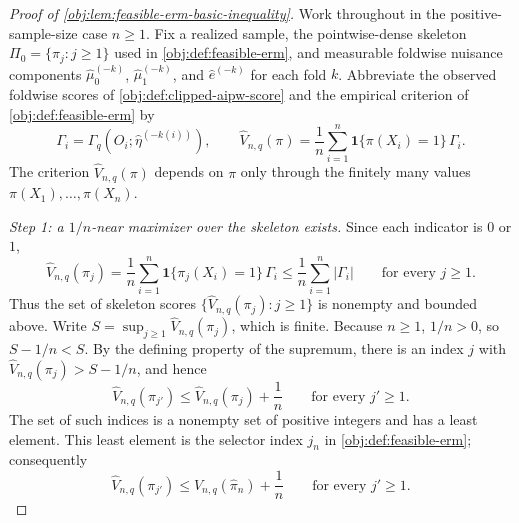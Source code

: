\begin{proof}[Proof of \cref{obj:lem:feasible-erm-basic-inequality}]
Work throughout in the positive-sample-size case \(n\ge1\).  Fix a realized sample, the pointwise-dense skeleton \(\Pi_0=\{\pi_j:j\ge1\}\) used in \cref{obj:def:feasible-erm}, and measurable foldwise nuisance components \(\widehat\mu_0^{(-k)}\), \(\widehat\mu_1^{(-k)}\), and \(\widehat e^{(-k)}\) for each fold \(k\).  Abbreviate the observed foldwise scores of \cref{obj:def:clipped-aipw-score} and the empirical criterion of \cref{obj:def:feasible-erm} by
\[
\Gamma_i=\Gamma_q\!\left(O_i;\widehat\eta^{(-k(i))}\right),
\qquad
\widehat V_{n,q}(\pi)=\frac1n\sum_{i=1}^n\mathbf 1\{\pi(X_i)=1\}\,\Gamma_i .
\]
The criterion \(\widehat V_{n,q}(\pi)\) depends on \(\pi\) only through the finitely many values \(\pi(X_1),\ldots,\pi(X_n)\).

\emph{Step 1: a \(1/n\)-near maximizer over the skeleton exists.}  Since each indicator is \(0\) or \(1\),
\[
\widehat V_{n,q}(\pi_j)
=\frac1n\sum_{i=1}^n\mathbf 1\{\pi_j(X_i)=1\}\,\Gamma_i
\le\frac1n\sum_{i=1}^n|\Gamma_i|
\qquad\text{for every }j\ge1.
\]
Thus the set of skeleton scores \(\{\widehat V_{n,q}(\pi_j):j\ge1\}\) is nonempty and bounded above.  Write \(S=\sup_{j\ge1}\widehat V_{n,q}(\pi_j)\), which is finite.  Because \(n\ge1\), \(1/n>0\), so \(S-1/n<S\).  By the defining property of the supremum, there is an index \(j\) with \(\widehat V_{n,q}(\pi_j)>S-1/n\), and hence
\[
\widehat V_{n,q}(\pi_{j'})\le \widehat V_{n,q}(\pi_j)+\frac1n
\qquad\text{for every }j'\ge1 .
\]
The set of such indices is a nonempty set of positive integers and has a least element.  This least element is the selector index \(j_n\) in \cref{obj:def:feasible-erm}; consequently
\[
\widehat V_{n,q}(\pi_{j'})\le \widehat V_{n,q}(\widehat\pi_n)+\frac1n
\qquad\text{for every }j'\ge1 .
\]


\end{proof}

